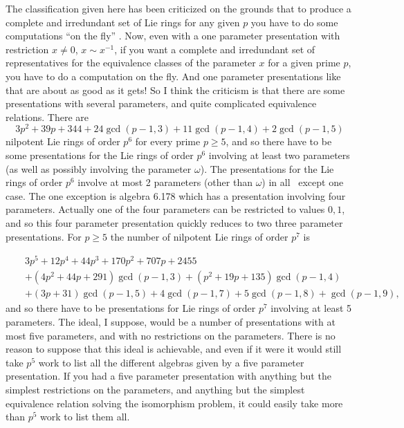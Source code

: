 \documentclass[10pt]{article}
\begin{document}
The classification given here has been criticized on the grounds that to
produce a complete and irredundant set of Lie rings for any given $p$ you
have to do some computations \textquotedblleft on the fly\textquotedblright
. Now, even with a one parameter presentation with restriction $x\neq 0$, $%
x\sim x^{-1}$, if you want a complete and irredundant set of representatives
for the equivalence classes of the parameter $x$ for a given prime $p$, you
have to do a computation on the fly. And one parameter presentations like
that are about as good as it gets! So I think the criticism is that there
are some presentations with several parameters, and quite complicated
equivalence relations. There are%
\[
3p^{2}+39p+344+24\gcd (p-1,3)+11\gcd (p-1,4)+2\gcd (p-1,5) 
\]%
nilpotent Lie rings of order $p^{6}$ for every prime $p\geq 5$, and so there
have to be some presentations for the Lie rings of order $p^{6}$ involving
at least two parameters (as well as possibly involving the parameter $\omega 
$). The presentations for the Lie rings of order $p^{6}$ involve at most 2
parameters (other than $\omega $) in all \ except one case. The one
exception is algebra 6.178 which has a presentation involving four
parameters. Actually one of the four parameters can be restricted to values $%
0,1$, and so this four parameter presentation quickly reduces to two three
parameter presentations. For $p\geq 5$ the number of nilpotent Lie rings of
order $p^{7}$ is

\begin{eqnarray*}
&&\allowbreak 3p^{5}+12p^{4}+44p^{3}+\allowbreak 170p^{2}+707p+2455 \\
&&+(4p^{2}+44p+291)\gcd (p-1,3)+\allowbreak (p^{2}+19p+135)\gcd (p-1,4) \\
&&+(3p+31)\gcd (p-1,5)+4\gcd (p-1,7)+5\gcd (p-1,8)+\gcd (p-1,9),
\end{eqnarray*}%
and so there have to be presentations for Lie rings of order $p^{7}$
involving at least 5 parameters. The ideal, I suppose, would be a number of
presentations with at most five parameters, and with no restrictions on the
parameters. There is no reason to suppose that this ideal is achievable, and
even if it were it would still take $p^{5}$ work to list all the different
algebras given by a five parameter presentation. If you had a five parameter
presentation with anything but the simplest restrictions on the parameters,
and anything but the simplest equivalence relation solving the isomorphism
problem, it could easily take more than $p^{5}$ work to list them all.
\end{document}
